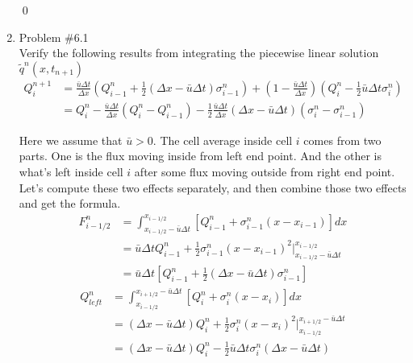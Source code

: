 \documentclass[11pt]{article}
\begin{document}
\begin{enumerate}
\begin{enumerate}
        	
        	\end{enumerate}

\qed
\newpage
    \item Problem \#6.1 \\
            Verify the following results from integrating the piecewise linear solution $\tilde{q}^n(x,t_{n+1})$
            \begin{align*}
            Q_i^{n+1}&=\frac{\bar{u}\Delta t}{\Delta x}(Q_{i-1}^n+\frac{1}{2}(\Delta x-\bar{u}\Delta t)\sigma_{i-1}^n)+(1-\frac{\bar{u}\Delta t}{\Delta x})(Q_i^n-\frac{1}{2}\bar{u}\Delta t \sigma_i^n)\\
            &=Q_i^n-\frac{\bar{u}\Delta t}{\Delta x}(Q_i^n-Q_{i-1}^n)-\frac{1}{2}\frac{\bar{u}\Delta t}{\Delta x}(\Delta x -\bar{u}\Delta t)(\sigma_i^n-\sigma_{i-1}^n)
            \end{align*}

        \vskip 5pt
        \vskip 5pt
			
			Here we assume that $\bar{u}>0$. The cell average inside cell $i$ comes from two parts. One is the flux moving inside from left end point. And the other is what's left inside cell $i$ after some flux moving outside from right end point. Let's compute these two effects separately, and then combine those two effects and get the formula.
			\begin{align*}
			F_{i-1/2}^n &= \int_{x_{i-1/2}-\bar{u}\Delta t}^{x_{i-1/2}}
			[Q_{i-1}^n+\sigma_{i-1}^n(x-x_{i-1})]dx \\
			&= \bar{u}\Delta t Q_{i-1}^n + \frac{1}{2}\sigma_{i-1}^n
			(x-x_{i-1})^2|_{x_{i-1/2}-\bar{u}\Delta t}^{x_{i-1/2}}\\
			&=\bar{u}\Delta t[Q_{i-1}^n+\frac{1}{2}(\Delta x-\bar{u}\Delta t)\sigma_{i-1}^n]
			\end{align*}
			\begin{align*}
			Q_{left}^n &= \int_{x_{i-1/2}}^{x_{i+1/2}-\bar{u}\Delta t}
			[Q_i^n+\sigma_i^n(x-x_i)]dx \\
			&= (\Delta x - \bar{u}\Delta t) Q_i^n + \frac{1}{2}\sigma_i^n
			(x-x_i)^2|_{x_{i-1/2}}^{x_{i+1/2}-\bar{u}\Delta t}\\
			&=(\Delta x - \bar{u}\Delta t) Q_i^n-\frac{1}{2}\bar{u}\Delta t\sigma_i^n
			(\Delta x-\bar{u}\Delta t)
			\end{align*}
            

\end{enumerate}
\end{document}
